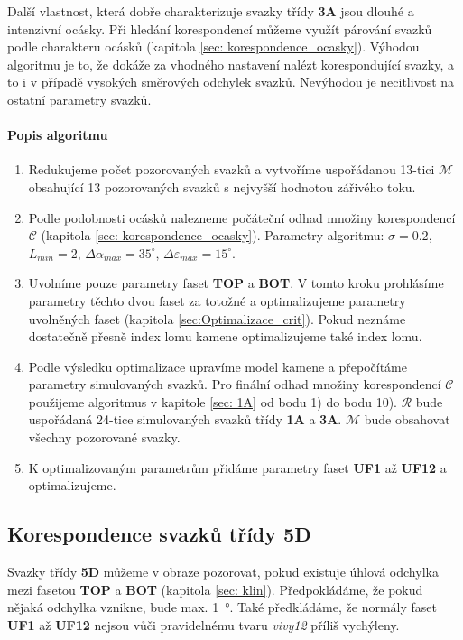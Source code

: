 	Další vlastnost, která dobře charakterizuje svazky třídy \textbf{3A} jsou dlouhé a intenzivní ocásky. Při hledání korespondencí můžeme využít párování svazků podle charakteru ocásků (kapitola \ref{sec: korespondence_ocasky}). Výhodou algoritmu je to, že dokáže za vhodného nastavení nalézt korespondující svazky, a to i v případě vysokých směrových odchylek svazků. Nevýhodou je necitlivost na ostatní parametry svazků. 

\paragraph{Popis algoritmu} 

\begin{enumerate}
	\item Redukujeme počet pozorovaných svazků a vytvoříme uspořádanou 13-tici $\mathcal{M}$ obsahující 13 pozorovaných svazků s nejvyšší hodnotou zářivého toku.  

	\item Podle podobnosti ocásků nalezneme počáteční odhad množiny korespondencí $\mathcal{C}$ (kapitola \ref{sec: korespondence_ocasky}). Parametry algoritmu: $\sigma = 0.2$, $L_{min} = 2$, $\Delta\alpha_{max} = 35^\circ$, $\Delta\varepsilon_{max} = 15^\circ$.
	
	\item Uvolníme pouze parametry faset \textbf{TOP} a \textbf{BOT}. V tomto kroku prohlásíme parametry těchto dvou faset za totožné a optimalizujeme parametry uvolněných faset (kapitola \ref{sec:Optimalizace_crit}). Pokud neznáme dostatečně přesně index lomu kamene optimalizujeme také index lomu. 
	
	\item Podle výsledku optimalizace upravíme model kamene a přepočítáme parametry simulovaných svazků. Pro finální odhad množiny korespondencí $\mathcal{C}$ použijeme algoritmus v kapitole \ref{sec: 1A} od bodu 1) do bodu 10). $\mathcal{R}$ bude uspořádaná 24-tice simulovaných svazků třídy \textbf{1A} a \textbf{3A}. $\mathcal{M}$ bude obsahovat všechny pozorované svazky.  
	
	\item K optimalizovaným parametrům přidáme parametry faset \textbf{UF1} až \textbf{UF12} a optimalizujeme. 
		
\end{enumerate}

\newpage
\subsection{Korespondence svazků třídy \textbf{5D}}
\label{sec:5D}
	Svazky třídy \textbf{5D} můžeme v obraze pozorovat, pokud existuje úhlová odchylka mezi fasetou \textbf{TOP} a \textbf{BOT} (kapitola \ref{sec: klin}). Předpokládáme, že pokud nějaká odchylka vznikne, bude max. \SI{1}{\degree}. Také předkládáme, že normály faset \textbf{UF1} až \textbf{UF12} nejsou vůči pravidelnému tvaru \textit{vivy12} příliš vychýleny.
	
